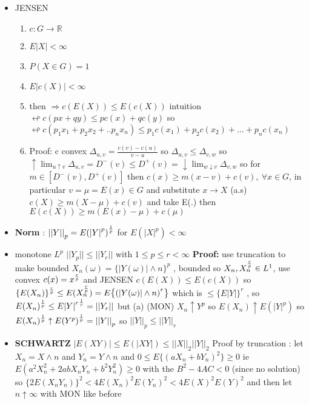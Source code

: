 \documentclass[10pt,landscape,a4paper]{article}
\begin{document}
\begin{multicols*}{3}
\begin{spacing}{0.5}
\begin{itemize}
\item \colorbox{green!10}{JENSEN}
\begin{enumerate}
\item $ c: G \rightarrow \mathbb{R}$ 
\item $E|X| < \infty$
\item $P(X \in G)=1$
\item $E |c(X)| < \infty$
\item then \colorbox{green!10}{ $\Rightarrow c(E(X)) \le E(c(X))$} intuition $\looparrowleft c(px+qy) \le pc(x) + q c(y) $ so $\looparrowleft c(p_1 x_1+ p_2 x_2 + .. p_n x_n) \le p_1 c(x_1) + p_2 c(x_2) + ... + p_n c(x_n) $
\item Proof: c convex $\Delta_{u,v}=\frac{c(v)-c(u)}{v-u}$ so $\Delta_{u,v} \le \Delta_{v,w}$ so $\uparrow \lim_{u \uparrow v} \Delta_{u,v} = D^-(v)\le D^+(v) = \downarrow  \lim_{w \downarrow v} \Delta_{v,w}$ so for $m \in [D^-(v),D^+(v)]$ then $c(x) \ge m(x-v) + c(v),\ \forall x \in G$, in particular $v=\mu=E(x) \in G$ and substitute $x \rightarrow X$ (a.s) $c(X) \ge m(X-\mu) + c(v)$ and take E(.) then $E (c(X)) \ge m (E(x)-\mu)+c(\mu)$
\end{enumerate}

\item \textbf{Norm} : \colorbox{green!10}{ ${||Y||}_p = {E({|Y|}^p)}^{1 \over p}$ } for $E(|X|^p) < \infty$
\item \colorbox{green!10}{monotone $L^p$ $|| Y_p || \le || Y_r || $ with $1 \le p \le r < \infty $} \textbf{Proof:} use truncation to make bounded $X_n(\omega)= \big\{|Y(\omega)| \wedge n \big \}^p$ , bounded so $X_n , X_n^{r \over p}\in L^1$, use convex $c(x)=x^{r \over p}$ and JENSEN $c(E(X)) \le E(c(X))$ so $ {\{ E(X_n) \} }^{r \over p} \le E(X_n^{r \over p}) = E \big\{ {(|Y(\omega)| \wedge n)}^{r} \big \}$ which is $\le {\big \{ E {|Y|} \big \} }^r$ , so $E(X_n) ^ {1 \over p} \le {E {|Y|}^r }^{1 \over r} = ||Y_r||$ but (a) (MON) $X_n \uparrow Y^p$ so $E(X_n) \uparrow E(|Y|^p)$ so $E(X_n)^ {1 \over p} \uparrow {E(Y^p)}^{1 \over p} =  {||Y||}_p $ so ${||Y||}_p \le {||Y||}_r$

\item \colorbox{green!10}{\textbf{SCHWARTZ} $|E(XY)| \le E(|XY|) \le {||X||}_2 {||Y||}_2 $} Proof by truncation : let  $X_n = X \wedge n$ and $Y_n = Y \wedge n$ and $0 \le E \big \{ {(aX_n+bY_n)}^2 \big \} \ge 0 $ ie $E(a^2X_n^2 +2abX_nY_n + b^2Y_n^2) \ge 0$ with the $B^2-4AC<0$ (since no solution) so $ { \{ 2E(X_nY_n) \} } ^2 < 4 {E(X_n)}^2{E(Y_n)}^2 < 4 {E(X)}^2{E(Y)}^2$ and then let $n \uparrow \infty$ with MON like before


\end{itemize}
\end{spacing}
\end{multicols*}
\end{document}
